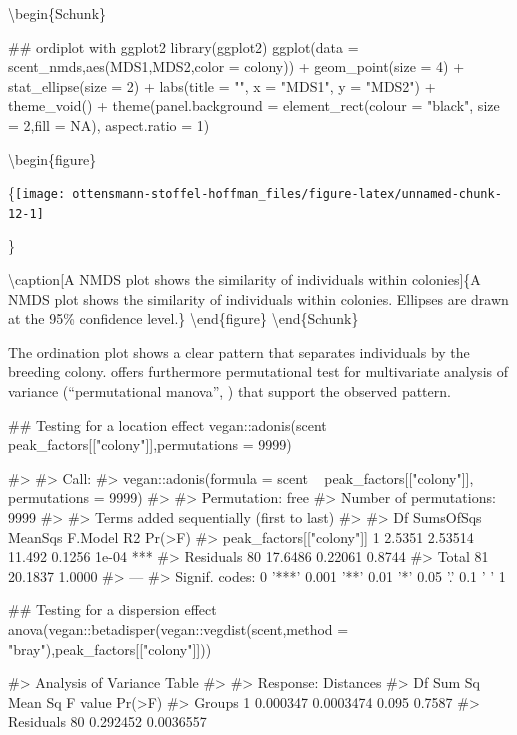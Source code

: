 \textbackslash{}begin\{Schunk\}

\begin{Sinput}
## ordiplot with ggplot2
library(ggplot2)
ggplot(data = scent_nmds,aes(MDS1,MDS2,color = colony)) +
    geom_point(size = 4) + 
    stat_ellipse(size = 2) + 
    labs(title = "", x = "MDS1", y = "MDS2") +  
    theme_void() + 
    theme(panel.background = element_rect(colour = "black", size = 2,fill = NA),
          aspect.ratio = 1)
\end{Sinput}

\textbackslash{}begin\{figure\}

\{\centering \texttt{[image: ottensmann-stoffel-hoffman\_files/figure-latex/unnamed-chunk-12-1]}

\}

\textbackslash{}caption{[}A NMDS plot shows the similarity of
individuals within colonies{]}\{A NMDS plot shows the similarity of
individuals within colonies. Ellipses are drawn at the 95\% confidence
level.\}\label{fig:unnamed-chunk-12} \textbackslash{}end\{figure\}
\textbackslash{}end\{Schunk\}

The ordination plot shows a clear pattern that separates individuals by
the breeding colony.  offers furthermore permutational test
for multivariate analysis of variance (``permutational manova'',
\citep{Anderson.2001}) that support the observed pattern.

\begin{Schunk}
\begin{Sinput}
## Testing for a location effect
vegan::adonis(scent ~ peak_factors[["colony"]],permutations = 9999)
\end{Sinput}
\begin{Soutput}
#> 
#> Call:
#> vegan::adonis(formula = scent ~ peak_factors[["colony"]], permutations = 9999) 
#> 
#> Permutation: free
#> Number of permutations: 9999
#> 
#> Terms added sequentially (first to last)
#> 
#>                          Df SumsOfSqs MeanSqs F.Model     R2 Pr(>F)    
#> peak_factors[["colony"]]  1    2.5351 2.53514  11.492 0.1256  1e-04 ***
#> Residuals                80   17.6486 0.22061         0.8744           
#> Total                    81   20.1837                 1.0000           
#> ---
#> Signif. codes:  0 '***' 0.001 '**' 0.01 '*' 0.05 '.' 0.1 ' ' 1
\end{Soutput}
\begin{Sinput}
## Testing for a dispersion effect
anova(vegan::betadisper(vegan::vegdist(scent,method = "bray"),peak_factors[["colony"]]))
\end{Sinput}
\begin{Soutput}
#> Analysis of Variance Table
#> 
#> Response: Distances
#>           Df   Sum Sq   Mean Sq F value Pr(>F)
#> Groups     1 0.000347 0.0003474   0.095 0.7587
#> Residuals 80 0.292452 0.0036557
\end{Soutput}
\end{Schunk}

